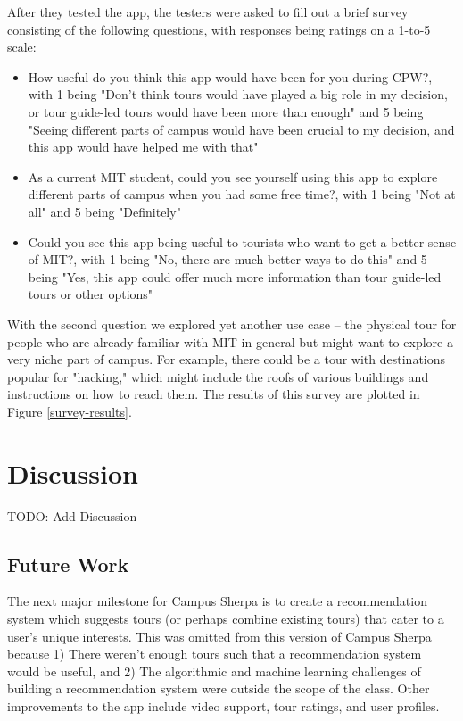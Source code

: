 \documentclass{sigchi}
\begin{document}
After they tested the app, the testers were asked to fill out a brief survey consisting of the following questions, with responses being ratings on a 1-to-5 scale:
\begin{itemize}
\item How useful do you think this app would have been for you during CPW?, with 1 being "Don't think tours would have played a big role in my decision, or tour guide-led tours would have been more than enough" and 5 being "Seeing different parts of campus would have been crucial to my decision, and this app would have helped me with that"
\item As a current MIT student, could you see yourself using this app to explore different parts of campus when you had some free time?, with 1 being "Not at all" and 5 being "Definitely"
\item Could you see this app being useful to tourists who want to get a better sense of MIT?, with 1 being "No, there are much better ways to do this" and 5 being "Yes, this app could offer much more information than tour guide-led tours or other options"
\end{itemize}
With the second question we explored yet another use case -- the physical tour for people who are already familiar with MIT in general but might want to explore a very niche part of campus. For example, there could be a tour with destinations popular for "hacking," which might include the roofs of various buildings and instructions on how to reach them. The results of this survey are plotted in Figure \ref{survey-results}.

\section{Discussion}

TODO: Add Discussion

\subsection{Future Work}

The next major milestone for Campus Sherpa is to create a recommendation system which suggests tours (or perhaps combine existing tours) that cater to a user's unique interests. This was omitted from this version of Campus Sherpa because 1) There weren't enough tours such that a recommendation system would be useful, and 2) The algorithmic and machine learning challenges of building a recommendation system were outside the scope of the class. Other improvements to the app include video support, tour ratings, and user profiles.
\end{document}
